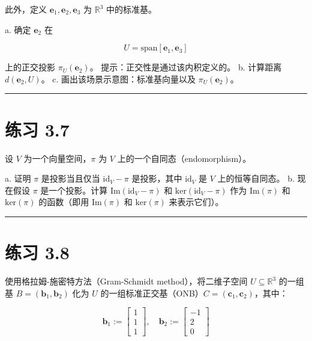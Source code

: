 此外，定义 $ \boldsymbol{e}_1, \boldsymbol{e}_2, \boldsymbol{e}_3 $ 为 $ \mathbb{R}^3 $ 中的标准基。

a. 确定 $ \boldsymbol{e}_2 $ 在

\begin{equation*}
U = \text{span}[\boldsymbol{e}_1, \boldsymbol{e}_3]
\end{equation*}

上的正交投影 $ \pi_U(\boldsymbol{e}_2) $。 提示：正交性是通过该内积定义的。 b. 计算距离 $ d(\boldsymbol{e}_2, U) $。 c. 画出该场景示意图：标准基向量以及 $ \pi_U(\boldsymbol{e}_2) $。

\medskip\hrule\medskip

\section*{练习 3.7}

设 $ V $ 为一个向量空间，$ \pi $ 为 $ V $ 上的一个自同态（endomorphism）。

a. 证明 $ \pi $ 是投影当且仅当 $ \text{id}_V - \pi $ 是投影，其中 $ \text{id}_V $ 是 $ V $ 上的恒等自同态。 b. 现在假设 $ \pi $ 是一个投影。计算 $ \text{Im}(\text{id}_V - \pi) $ 和 $ \text{ker}(\text{id}_V - \pi) $ 作为 $ \text{Im}(\pi) $ 和 $ \text{ker}(\pi) $ 的函数（即用 $ \text{Im}(\pi) $ 和 $ \text{ker}(\pi) $ 来表示它们）。

\medskip\hrule\medskip

\section*{练习 3.8}

使用格拉姆-施密特方法（Gram-Schmidt method），将二维子空间 $ U \subseteq \mathbb{R}^3 $ 的一组基 $ B = (\boldsymbol{b}_1, \boldsymbol{b}_2) $ 化为 $ U $ 的一组标准正交基（ONB）$ C = (\boldsymbol{c}_1, \boldsymbol{c}_2) $，其中：

\begin{equation*}
\boldsymbol{b}_1 := \begin{bmatrix} 1 \\ 1 \\ 1 \end{bmatrix}, \quad \boldsymbol{b}_2 := \begin{bmatrix} -1 \\ 2 \\ 0 \end{bmatrix}
\end{equation*}

